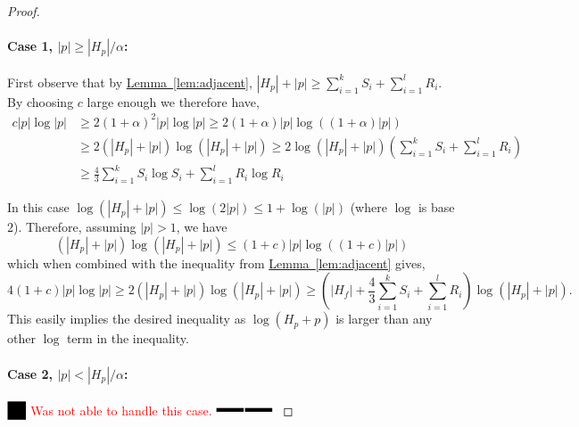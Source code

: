 \documentclass[11pt]{article}
\theoremstyle{definition}
\newcommand{\Clm}[1]{\hyperref[clm:#1]{Claim~\ref*{clm:#1}}} %
\newcommand{\Lem}[1]{\hyperref[lem:#1]{Lemma~\ref*{lem:#1}}} %
\newcommand{\XSays}[2]{{
      {$\rule[-0.12cm]{0.2in}{0.5cm}$\fbox{\tt
            #1:} }
      \textcolor{red}{#2}
      \marginpar{\textcolor{blue}{#1}}
      {$\rule[0.1cm]{0.3in}{0.1cm}$\fbox{\tt
            end}$\rule[0.1cm]{0.3in}{0.1cm}$}
      }
   }
\newcommand{\Ben}[1]{{\XSays{Ben}{#1}}}
\newcommand{\pth}[2][\!]{#1\left({#2}\right)}
\begin{document}
{\begin{proof}
\paragraph{Case 1, $|p|\geq |H_p|/\alpha$:\\}
First observe that by \Lem{adjacent}, $|H_p|+|p| \geq \sum_{i=1}^k S_i+ \sum_{i=1}^l R_i$.
By choosing $c$ large enough we therefore have,
\begin{align*}
 c|p|\log|p| &\geq 2(1+\alpha)^2 |p|\log |p| \geq 2(1+\alpha)|p| \log((1+\alpha)|p|)\\
             &\geq 2(|H_p|+|p|)\log(|H_p|+|p|) \geq 2\log(|H_p|+|p|) \pth{\sum_{i=1}^k S_i + \sum_{i=1}^l R_i}\\
             &\geq \frac{4}{3}\sum_{i=1}^k S_i \log S_i + \sum_{i=1}^l R_i \log R_i 
\end{align*}



In this case $\log(|H_p|+|p|)\leq \log(2|p|) \leq 1+\log(|p|)$ (where $\log$ is base $2$).
Therefore, assuming $|p|>1$, we have 
\[
(|H_p|+|p|)\log(|H_p|+|p|)\leq (1+c)|p|\log((1+c)|p|) %
\]
which when combined with the inequality from \Lem{adjacent} gives, 
\[
 4(1+c)|p|\log |p| \geq 2(|H_p|+|p|)\log(|H_p|+|p|)\geq \pth{|H_f| + \frac{4}{3}\sum_{i=1}^k S_i + \sum_{i=1}^l R_i}\log(|H_p|+|p|).
\]
This easily implies the desired inequality as $\log(H_p+p)$ is larger than any other $\log$ term in the inequality.

\paragraph{Case 2, $|p|< |H_p|/\alpha$:\\}

\Ben{Was not able to handle this case.}

%  
%  
%  
\end{proof}





}
\end{document}
